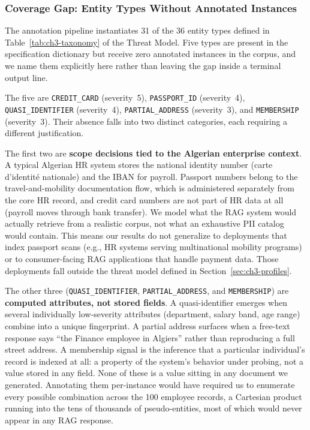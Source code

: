 \documentclass[11pt,a4paper]{report}
\begin{document}
\subsubsection{Coverage Gap: Entity Types Without Annotated Instances}
\label{ch3:subsec:coverage-gap}

The annotation pipeline instantiates 31 of the 36 entity types defined in Table~\ref{tab:ch3-taxonomy} of the Threat Model. Five types are present in the specification dictionary but receive zero annotated instances in the corpus, and we name them explicitly here rather than leaving the gap inside a terminal output line.

The five are \texttt{CREDIT\_CARD} (severity~5), \texttt{PASSPORT\_ID} (severity~4), \texttt{QUASI\_IDENTIFIER} (severity~4), \texttt{PARTIAL\_ADDRESS} (severity~3), and \texttt{MEMBERSHIP} (severity~3). Their absence falls into two distinct categories, each requiring a different justification.

The first two are \textbf{scope decisions tied to the Algerian enterprise context}. A typical Algerian HR system stores the national identity number (carte d'identité nationale) and the IBAN for payroll. Passport numbers belong to the travel-and-mobility documentation flow, which is administered separately from the core HR record, and credit card numbers are not part of HR data at all (payroll moves through bank transfer). We model what the RAG system would actually retrieve from a realistic corpus, not what an exhaustive PII catalog would contain. This means our results do not generalize to deployments that index passport scans (e.g., HR systems serving multinational mobility programs) or to consumer-facing RAG applications that handle payment data. Those deployments fall outside the threat model defined in Section~\ref{sec:ch3-profiles}.

The other three (\texttt{QUASI\_IDENTIFIER}, \texttt{PARTIAL\_ADDRESS}, and \texttt{MEMBERSHIP}) are \textbf{computed attributes, not stored fields}. A quasi-identifier emerges when several individually low-severity attributes (department, salary band, age range) combine into a unique fingerprint. A partial address surfaces when a free-text response says ``the Finance employee in Algiers'' rather than reproducing a full street address. A membership signal is the inference that a particular individual's record is indexed at all: a property of the system's behavior under probing, not a value stored in any field. None of these is a value sitting in any document we generated. Annotating them per-instance would have required us to enumerate every possible combination across the 100 employee records, a Cartesian product running into the tens of thousands of pseudo-entities, most of which would never appear in any RAG response.
\end{document}

